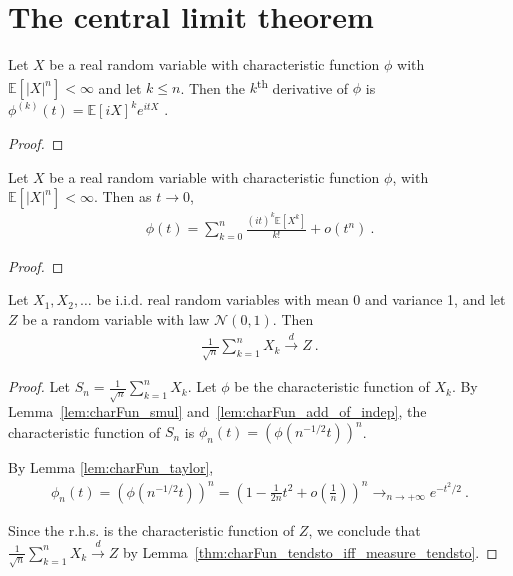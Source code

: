 \chapter{The central limit theorem}

\begin{lemma}\label{lem:deriv_charFun}
Let $X$ be a real random variable with characteristic function $\phi$ with $\mathbb{E}[\vert X \vert^n] < \infty$ and let $k \le n$.
Then the $k$\textsuperscript{th} derivative of $\phi$ is 
$\phi^{(k)}(t) = \mathbb{E}[i X]^k e^{i t X}$ \: .
\end{lemma}

\begin{proof}
\end{proof}


\begin{lemma}\label{lem:charFun_taylor}
Let $X$ be a real random variable with characteristic function $\phi$, with $\mathbb{E}[\vert X \vert^n] < \infty$. Then as $t \to 0$,
\begin{align*}
\phi(t) = \sum_{k=0}^n \frac{(it)^k \mathbb{E}[X^k]}{k!} + o(t^n)
\: .
\end{align*}
\end{lemma}

\begin{proof}
\end{proof}


\begin{theorem}\label{clt}
    \leanok
Let $X_1, X_2, \ldots$ be i.i.d. real random variables with mean 0 and variance 1, and let $Z$ be a random variable with law $\mathcal N(0,1)$. Then
\begin{align*}
\frac{1}{\sqrt{n}}\sum_{k=1}^n X_k \xrightarrow{d} Z \: .
\end{align*}
\end{theorem}

\begin{proof}
\leanok
Let $S_n = \frac{1}{\sqrt{n}}\sum_{k=1}^n X_k$. Let $\phi$ be the characteristic function of $X_k$. By Lemma~\ref{lem:charFun_smul} and~\ref{lem:charFun_add_of_indep}, the characteristic function of $S_n$ is $\phi_n(t) = (\phi(n^{-1/2}t))^n$.

By Lemma \ref{lem:charFun_taylor},
\begin{align*}
\phi_n(t) = (\phi(n^{-1/2}t))^n = \left(1 - \frac{1}{2n}t^2 + o(\frac{1}{n})\right)^n \to_{n \to +\infty} e^{-t^2/2} \: .
\end{align*}

Since the r.h.s. is the characteristic function of $Z$, we conclude that $\frac{1}{\sqrt{n}}\sum_{k=1}^n X_k \xrightarrow{d} Z$ by Lemma~\ref{thm:charFun_tendsto_iff_measure_tendsto}.
\end{proof}
